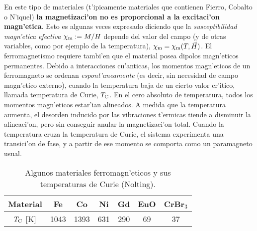 En este tipo de materiales (t'ipicamente materiales que
contienen Fierro, Cobalto o N'iquel) \textbf{la magnetizaci'on no es
proporcional a la excitaci'on magn'etica}. Esto es algunas veces expresado
diciendo que la \textit{susceptibilidad magn'etica efectiva} $\chi_{\rm m}:=M/H$ depende del valor del campo (y de otras variables, como por ejemplo de la temperatura), $\chi_{\rm m}=\chi_{\rm m}(T,\vec{H})$. El ferromagnetismo
requiere tambi'en que el material posea dipolos magn'eticos permanentes. Debido
a interacciones cu'anticas, los momentos magn'eticos de un ferromagneto se
ordenan \textit{espont'aneamente} (es decir, sin necesidad de campo magn'etico
externo), cuando la temperatura baja de un cierto valor cr'itico, llamada
temperatura de Curie, $T_{\rm C}$. En el cero absoluto de temperatura, todos los
momentos magn'eticos estar'ian alineados. A medida que la temperatura aumenta, el
desorden inducido por las vibraciones t'ermicas tiende a disminuir la
alineaci'on, pero sin conseguir
anular la magnetizaci'on total. Cuando la temperatura cruza la temperatura de
Curie, el sistema experimenta una transici'on de fase, y a partir de ese
momento se comporta como un paramagneto usual.
\begin{table}[h!]
\begin{center}
\begin{tabular}{c||c|c|c|c|c|c}
Material & Fe & Co & Ni & Gd & EuO & CrBr${}_3$  \\ \hline
$T_{\rm C}$ [K] & 1043 & 1393 & 631 & 290 & 69 & 37
\end{tabular}
\caption{Algunos materiales ferromagn'eticos y sus temperaturas de Curie
(Nolting).}
\end{center}
\end{table}

